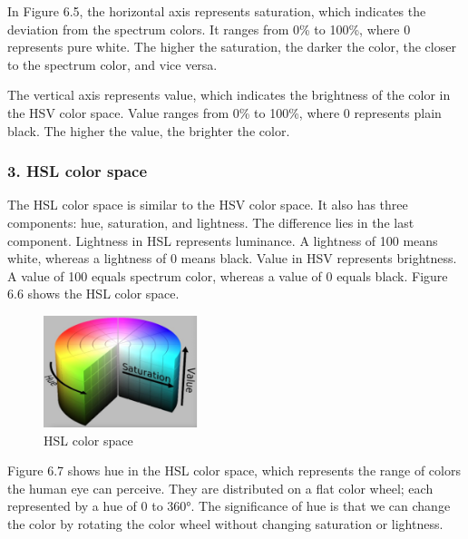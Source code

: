 \documentclass[a4paper,12pt,openany]{book}
\begin{document}
In Figure 6.5, the horizontal axis represents saturation, which indicates the deviation from the spectrum colors. It ranges from 0\% to 100\%, where 0 represents pure white. The higher the saturation, the darker the color, the closer to the spectrum color, and vice versa.

The vertical axis represents value, which indicates the brightness of the color in the HSV color space. Value ranges from 0\% to 100\%, where 0 represents plain black. The higher the value, the brighter the color.

\subsubsection{3. HSL color space}
The HSL color space is similar to the HSV color space. It also has three components: hue, saturation, and lightness. The difference lies in the last component. Lightness in HSL represents luminance. A lightness of 100 means white, whereas a lightness of 0 means black. Value in HSV represents brightness. A value of 100 equals spectrum color, whereas a value of 0 equals black. Figure 6.6 shows the HSL color space.

\begin{figure}[h!]
    \centering
    \includegraphics[width=0.4\textwidth]{D6Z/6-6}
    \caption{HSL color space}
\end{figure}

Figure 6.7 shows hue in the HSL color space, which represents the range of colors the human eye can perceive. They are distributed on a flat color wheel; each represented by a hue of 0 to 360°. The significance of hue is that we can change the color by rotating the color wheel without changing saturation or lightness.
\end{document}
